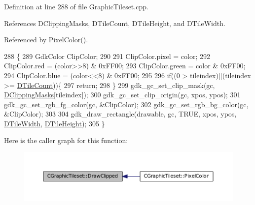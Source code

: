 Definition at line 288 of file Graphic\+Tileset.\+cpp.



References D\+Clipping\+Masks, D\+Tile\+Count, D\+Tile\+Height, and D\+Tile\+Width.



Referenced by Pixel\+Color().


\begin{DoxyCode}
288                                                                                                            
                \{
289     GdkColor ClipColor;
290     
291     ClipColor.pixel = color;
292     ClipColor.red = (color>>8) & 0xFF00;
293     ClipColor.green = color & 0xFF00;
294     ClipColor.blue = (color<<8) & 0xFF00;
295     
296     \textcolor{keywordflow}{if}((0 > tileindex)||(tileindex >= \hyperlink{classCGraphicTileset_a39d942b370e47f441bf97385eb1037c8}{DTileCount}))\{
297         \textcolor{keywordflow}{return};
298     \}
299     gdk\_gc\_set\_clip\_mask(gc, \hyperlink{classCGraphicTileset_a3761aec1b9a8bf189da5a7202d7fcac9}{DClippingMasks}[tileindex]);
300     gdk\_gc\_set\_clip\_origin(gc, xpos, ypos);
301     gdk\_gc\_set\_rgb\_fg\_color(gc, &ClipColor);
302     gdk\_gc\_set\_rgb\_bg\_color(gc, &ClipColor);
303     
304     gdk\_draw\_rectangle(drawable, gc, TRUE, xpos, ypos, \hyperlink{classCGraphicTileset_a2d0c7d19865b81911a3a43d5cae50e00}{DTileWidth}, 
      \hyperlink{classCGraphicTileset_af48f32e07d5fe69afd5f764318cc3244}{DTileHeight});
305 \}
\end{DoxyCode}
Here is the caller graph for this function\+:\nopagebreak
\begin{figure}[H]
\begin{center}
\leavevmode
\includegraphics[width=350pt]{classCGraphicTileset_a104935351be4c465f3ff08c111455d19_icgraph}
\end{center}
\end{figure}
\hypertarget{classCGraphicTileset_a8acad7ebeb4fad53a72681851f323812}{}\label{classCGraphicTileset_a8acad7ebeb4fad53a72681851f323812} 

